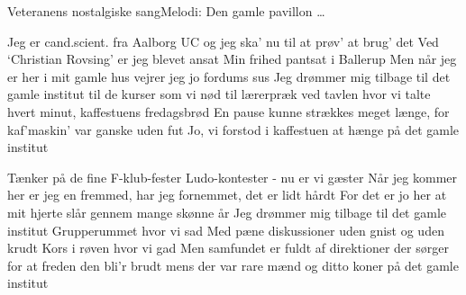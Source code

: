 \begin{sang}{Veteranens nostalgiske sang}{Melodi: Den gamle pavillon \ldots}
\begin{vers}
Jeg er cand.scient. fra Aalborg UC 
og jeg ska' nu til 
at prøv' at brug' det 
Ved `Christian Rovsing' er jeg blevet ansat 
Min frihed pantsat 
i Ballerup 
Men når jeg er her i mit gamle hus 
vejrer jeg jo fordums sus 
Jeg drømmer mig tilbage til det gamle institut 
til de kurser som vi nød 
til lærerpræk ved tavlen hvor vi talte hvert minut, 
kaffestuens fredagsbrød 
En pause kunne strækkes meget længe, 
for kaf'maskin' var ganske uden fut 
Jo, vi forstod i kaffestuen at hænge 
på det gamle institut
\end{vers}
\begin{vers}
Tænker på de fine F-klub-fester 
Ludo-kontester 
- nu er vi gæster 
Når jeg kommer her er jeg en fremmed, 
har jeg fornemmet, 
det er lidt hårdt 
For det er jo her at mit hjerte slår 
gennem mange skønne år 
Jeg drømmer mig tilbage til det gamle institut 
Grupperummet hvor vi sad 
Med pæne diskussioner uden gnist og uden krudt 
Kors i røven hvor vi gad 
Men samfundet er fuldt af direktioner  
der sørger for at freden den bli'r brudt 
mens der var rare mænd og ditto koner  
på det gamle institut
\end{vers}
\laps
\end{sang}